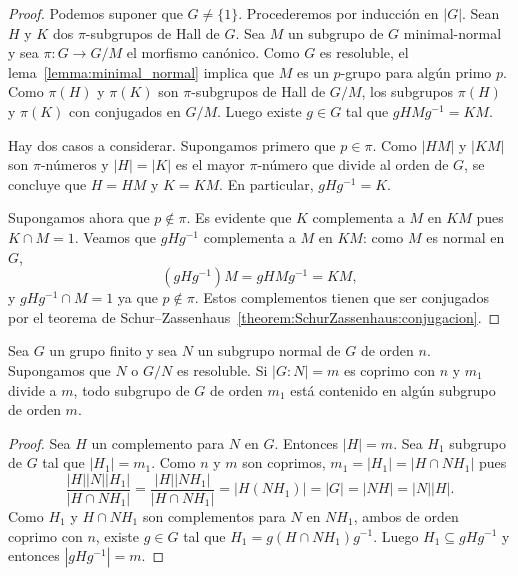 \begin{proof}
	Podemos suponer que $G\ne\{1\}$. Procederemos por inducción en $|G|$.  Sean $H$
	y $K$ dos $\pi$-subgrupos de Hall de $G$. Sea $M$ un subgrupo de $G$
	minimal-normal y sea $\pi\colon G\to G/M$ el morfismo canónico. Como $G$ es
	resoluble, el lema~\ref{lemma:minimal_normal} implica que  $M$ es un
	$p$-grupo para algún primo $p$.  Como $\pi(H)$ y $\pi(K)$ son
	$\pi$-subgrupos de Hall de $G/M$, los subgrupos $\pi(H)$ y $\pi(K)$ con
	conjugados en $G/M$. Luego existe $g\in G$ tal que $gHMg^{-1}=KM$. 

	Hay dos casos a considerar. Supongamos primero que $p\in\pi$. Como $|HM|$ y
	$|KM|$ son $\pi$-números y $|H|=|K|$ es el mayor $\pi$-número que divide al
	orden de $G$, se concluye que $H=HM$ y $K=KM$. En particular, $gHg^{-1}=K$. 

	Supongamos ahora que $p\not\in\pi$. Es evidente que $K$ complementa a $M$ en
	$KM$ pues $K\cap M=1$. Veamos que $gHg^{-1}$ complementa a $M$ en $KM$:
	como $M$ es normal en $G$, 
	\[
	(gHg^{-1})M=gHMg^{-1}=KM,
	\]
	y $gHg^{-1}\cap M=1$ ya que $p\not\in\pi$. Estos complementos tienen que
	ser conjugados por el teorema de
	Schur--Zassenhaus~\ref{theorem:SchurZassenhaus:conjugacion}.
\end{proof}

\begin{corollary}
	Sea $G$ un grupo finito y sea $N$ un subgrupo normal de $G$ de orden $n$.
	Supongamos que $N$ o $G/N$ es resoluble. Si $|G:N|=m$ es coprimo con $n$ y
	$m_1$ divide a $m$, todo subgrupo de $G$ de orden $m_1$ está contenido en
	algún subgrupo de orden $m$.
\end{corollary}

\begin{proof}
	Sea $H$ un complemento para $N$ en $G$. Entonces $|H|=m$. Sea $H_1$
	subgrupo de $G$ tal que $|H_1|=m_1$. 
	Como $n$ y $m$ son coprimos, $m_1=|H_1|=|H\cap NH_1|$ pues
	\[
	\frac{|H||N||H_1|}{|H\cap NH_1|}=
	\frac{|H||NH_1|}{|H\cap NH_1|}=|H(NH_1)|=|G|=|NH|=|N||H|.
	\]
	Como $H_1$ y $H\cap NH_1$ son complementos para $N$ en $NH_1$, ambos de
	orden coprimo con $n$, existe $g\in G$ tal que $H_1=g(H\cap NH_1)g^{-1}$. Luego 
	$H_1\subseteq gHg^{-1}$ y entonces $|gHg^{-1}|=m$. 
\end{proof}
